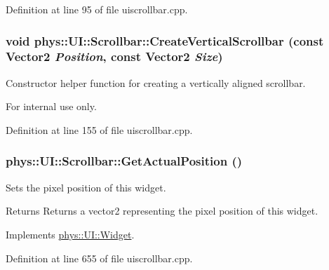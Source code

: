 Definition at line 95 of file uiscrollbar.cpp.

\hypertarget{classphys_1_1UI_1_1Scrollbar_a337378d76c9d1c05606c0498e16dac4d}{
\subsubsection[{CreateVerticalScrollbar}]{\setlength{\rightskip}{0pt plus 5cm}void phys::UI::Scrollbar::CreateVerticalScrollbar (const {\bf Vector2} {\em Position}, \/  const {\bf Vector2} {\em Size})}}
\label{d0/d3e/classphys_1_1UI_1_1Scrollbar_a337378d76c9d1c05606c0498e16dac4d}


Constructor helper function for creating a vertically aligned scrollbar. 

\begin{DoxyInternal}{For internal use only.}
\end{DoxyInternal}


Definition at line 155 of file uiscrollbar.cpp.

\hypertarget{classphys_1_1UI_1_1Scrollbar_a73337985c0f1f173e253c88705ae5d6e}{
\subsubsection[{GetActualPosition}]{ phys::UI::Scrollbar::GetActualPosition ()}}
\label{d0/d3e/classphys_1_1UI_1_1Scrollbar_a73337985c0f1f173e253c88705ae5d6e}


Sets the pixel position of this widget. 

\begin{DoxyReturn}{Returns}
Returns a vector2 representing the pixel position of this widget. 
\end{DoxyReturn}


Implements \hyperlink{classphys_1_1UI_1_1Widget_a0a29fecff7f56d7909f65fd63b0990e7}{phys::UI::Widget}.



Definition at line 655 of file uiscrollbar.cpp.

